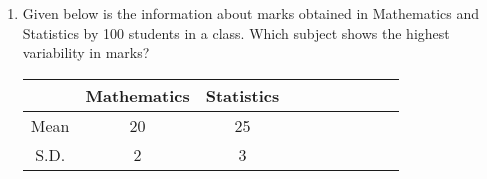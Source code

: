 \documentclass[17pt]{extarticle}
\begin{document}
\begin{multicols}{2}
\begin{enumerate}
\item Given below is the information about marks obtained in Mathematics and Statistics by 100 students in a class. Which subject shows
the highest variability in marks?
\begin{tabular}{|c|*{9}{c|}}
\hline  & Mathematics & Statistics \\
\hline Mean & 20 & 25  \\
\hline S.D. & 2 & 3  \\
\hline
\end{tabular}\\






\end{enumerate} 



\end{multicols}
 
\end{document}
